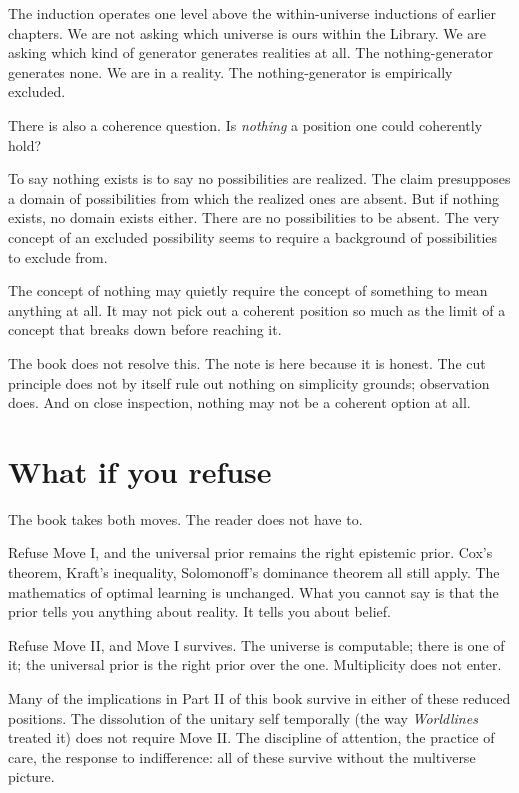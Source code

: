 The induction operates one level above the within-universe inductions of earlier chapters. We are not asking which universe is ours within the Library. We are asking which kind of generator generates realities at all. The nothing-generator generates none. We are in a reality. The nothing-generator is empirically excluded.

There is also a coherence question. Is \emph{nothing} a position one could coherently hold?

To say nothing exists is to say no possibilities are realized. The claim presupposes a domain of possibilities from which the realized ones are absent. But if nothing exists, no domain exists either. There are no possibilities to be absent. The very concept of an excluded possibility seems to require a background of possibilities to exclude from.

The concept of nothing may quietly require the concept of something to mean anything at all. It may not pick out a coherent position so much as the limit of a concept that breaks down before reaching it.

The book does not resolve this. The note is here because it is honest. The cut principle does not by itself rule out nothing on simplicity grounds; observation does. And on close inspection, nothing may not be a coherent option at all.

\section*{What if you refuse}

The book takes both moves. The reader does not have to.

Refuse Move I, and the universal prior remains the right epistemic prior. Cox's theorem, Kraft's inequality, Solomonoff's dominance theorem all still apply. The mathematics of optimal learning is unchanged. What you cannot say is that the prior tells you anything about reality. It tells you about belief.

Refuse Move II, and Move I survives. The universe is computable; there is one of it; the universal prior is the right prior over the one. Multiplicity does not enter.

Many of the implications in Part II of this book survive in either of these reduced positions. The dissolution of the unitary self temporally (the way \textit{Worldlines} treated it) does not require Move II. The discipline of attention, the practice of care, the response to indifference: all of these survive without the multiverse picture.

